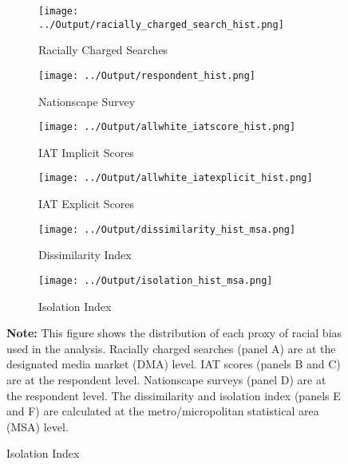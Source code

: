 \documentclass[11pt]{article}
\begin{document}
\newpage
\begin{figure}[H]
	\caption{\textbf{Distribution of Racial Animus}}\label{race_hist}
	\centering
	\begin{subfigure}{0.5\linewidth}
   		\caption{Racially Charged Searches}
   		\centering
   		\texttt{[image: ../Output/racially\_charged\_search\_hist.png]}
		\vspace{0.5cm}
   	\end{subfigure}%
   	\begin{subfigure}{0.5\linewidth}
   		\caption{Nationscape Survey}
   		\centering
   		\texttt{[image: ../Output/respondent\_hist.png]}
		\vspace{0.5cm}
    	\end{subfigure}

    	\begin{subfigure}{0.5\linewidth}
   		\caption{IAT Implicit Scores}
   		\centering
  		\texttt{[image: ../Output/allwhite\_iatscore\_hist.png]}
		\vspace{0.5cm}
  	\end{subfigure}%
  	\begin{subfigure}{0.5\linewidth}
  		\caption{IAT Explicit Scores}
  		\centering
   		\texttt{[image: ../Output/allwhite\_iatexplicit\_hist.png]}
		\vspace{0.5cm}
  	\end{subfigure}

	\begin{subfigure}{0.5\linewidth}
   		\caption{Dissimilarity Index}
   		\centering
  		\texttt{[image: ../Output/dissimilarity\_hist\_msa.png]}
  	\end{subfigure}%
  	\begin{subfigure}{0.5\linewidth}
  		\caption{Isolation Index}
  		\centering
   		\texttt{[image: ../Output/isolation\_hist\_msa.png]}
  	\end{subfigure}

	\begin{minipage}{\textwidth} \medskip
		\footnotesize{{\bf Note: }This figure shows the distribution of each proxy of racial bias used in the analysis. Racially charged searches (panel A) are at the designated media market (DMA) level. IAT scores (panels B and C) are at the respondent level. Nationscape surveys (panel D) are at the respondent level. The dissimilarity and isolation index (panels E and F) are calculated at the metro/micropolitan statistical area (MSA) level.}
	\end{minipage}
\end{figure}
\end{document}
